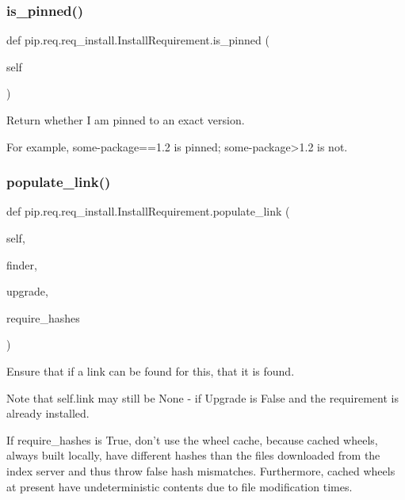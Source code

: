\subsubsection{\texorpdfstring{is\+\_\+pinned()}{is\_pinned()}}
{\footnotesize\ttfamily def pip.\+req.\+req\+\_\+install.\+Install\+Requirement.\+is\+\_\+pinned (\begin{DoxyParamCaption}\item[{}]{self }\end{DoxyParamCaption})}

\begin{DoxyVerb}Return whether I am pinned to an exact version.

For example, some-package==1.2 is pinned; some-package>1.2 is not.
\end{DoxyVerb}
 \mbox{\label{classpip_1_1req_1_1req__install_1_1_install_requirement_ac4dd98a7072a2d64cb9271e140e0e167}} 
\subsubsection{\texorpdfstring{populate\+\_\+link()}{populate\_link()}}
{\footnotesize\ttfamily def pip.\+req.\+req\+\_\+install.\+Install\+Requirement.\+populate\+\_\+link (\begin{DoxyParamCaption}\item[{}]{self,  }\item[{}]{finder,  }\item[{}]{upgrade,  }\item[{}]{require\+\_\+hashes }\end{DoxyParamCaption})}

\begin{DoxyVerb}Ensure that if a link can be found for this, that it is found.

Note that self.link may still be None - if Upgrade is False and the
requirement is already installed.

If require_hashes is True, don't use the wheel cache, because cached
wheels, always built locally, have different hashes than the files
downloaded from the index server and thus throw false hash mismatches.
Furthermore, cached wheels at present have undeterministic contents due
to file modification times.
\end{DoxyVerb}
 \mbox{\label{classpip_1_1req_1_1req__install_1_1_install_requirement_a87bc6c4e5dcd1b8d6eb13e9eac6d7a88}} 
